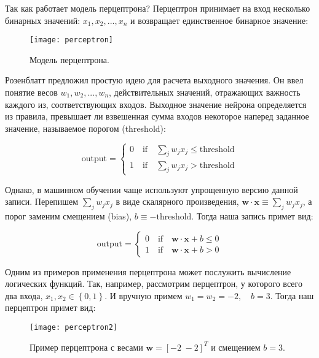 Так как работает модель перцептрона? Перцептрон принимает на вход несколько бинарных значений: 
$x_1, x_2, ..., x_n $ и возвращает единственное бинарное значение:

\begin{figure}[h!]
    \centering
    \texttt{[image: perceptron]}
    \caption{Модель перцептрона.}
    \label{fig:perceptron}
\end{figure}

Розенблатт предложил простую идею для расчета выходного значения. Он ввел понятие 
весов $w_1, w_2, ..., w_n$, действительных значений, отражающих важность каждого из, 
соответствующих входов. Выходное значение нейрона определяется из правила, превышает 
ли взвешенная сумма входов некоторое наперед заданное значение, называемое порогом 
(threshold):

\begin{equation*}
    \text{output} = \begin{cases}
        0 \quad \text{if} \quad \sum_j w_j x_j \leq \text{threshold} \\
        1 \quad \text{if} \quad \sum_j w_j x_j > \text{threshold} 
    \end{cases}
\end{equation*}

Однако, в машинном обучении чаще используют упрощенную версию данной записи. 
Перепишем $\sum_j w_j x_j$ в виде скалярного произведения, \hspace{20pt}
$\bm{w} \cdot \bm{x} \equiv \sum_j w_j x_j$, 
а порог заменим смещением (bias), $b \equiv -\text{threshold}$. Тогда наша запись примет вид:

\begin{equation*}
    \text{output} = \begin{cases}
        0 \quad \text{if} \quad \bm{w} \cdot \bm{x} + b \leq 0 \\
        1 \quad \text{if} \quad \bm{w} \cdot \bm{x} + b > 0 
    \end{cases}
\end{equation*}

Одним из примеров применения перцептрона может послужить вычисление логических функций.
Так, например, рассмотрим перцептрон, у которого всего два входа, $x_1, x_2 \in \left\{ 0, 1 \right\}$. 
И вручную примем $w_1 = w_2 = -2, \quad b = 3$. Тогда наш перцептрон примет вид:

\begin{figure}[h!]
    \centering
    \texttt{[image: perceptron2]}
    \caption{Пример перцептрона с весами $\bm{w} = \left[ -2 \hspace{3pt} -2 \right]^T$ и 
    смещением $b = 3$.}
    \label{fig:perceptron2}
\end{figure}

